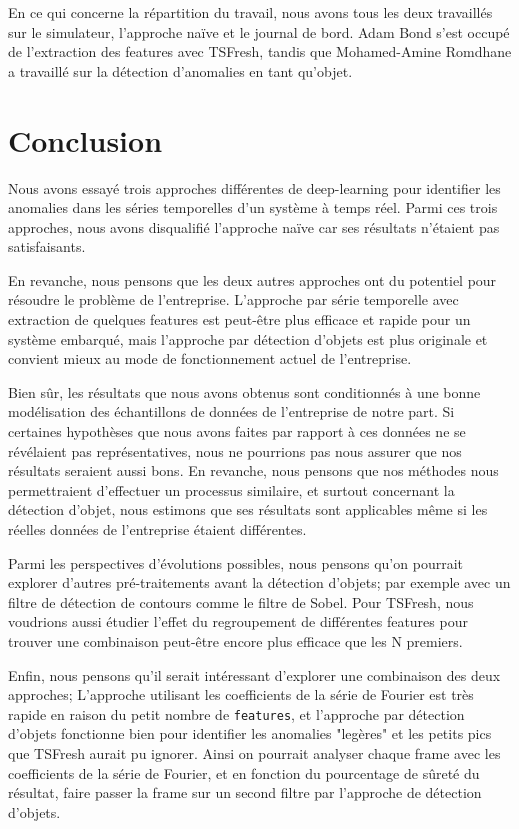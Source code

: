 \documentclass[french]{article}
\theoremstyle{mytheoremstyle}
\theoremstyle{mytheoremstyle}
\theoremstyle{myproblemstyle}
\begin{document}
    
    En ce qui concerne la répartition du travail, nous avons tous les deux travaillés sur le simulateur, l'approche naïve et le journal de bord. Adam Bond s'est occupé de l'extraction des features avec TSFresh, tandis que Mohamed-Amine Romdhane a travaillé sur la détection d'anomalies en tant qu'objet.
    
    
    
    
    \section{Conclusion}
    Nous avons essayé trois approches différentes de deep-learning pour identifier les anomalies dans les séries temporelles d'un système à temps réel. Parmi ces trois approches, nous avons disqualifié l'approche naïve car ses résultats n'étaient pas satisfaisants.
    
    
    En revanche, nous pensons que les deux autres approches ont du potentiel pour résoudre le problème de l'entreprise. L'approche par série temporelle avec extraction de quelques features est peut-être plus efficace et rapide pour un système embarqué, mais l'approche par détection d'objets est plus originale et convient mieux au mode de fonctionnement actuel de l'entreprise.
    
    
    Bien sûr, les résultats que nous avons obtenus sont conditionnés à une bonne modélisation des échantillons de données de l'entreprise de notre part. Si certaines hypothèses que nous avons faites par rapport à ces données ne se révélaient pas représentatives, nous ne pourrions pas nous assurer que nos résultats seraient aussi bons. En revanche, nous pensons que nos méthodes nous permettraient d'effectuer un processus similaire, et surtout concernant la détection d'objet, nous estimons que ses résultats sont applicables même si les réelles données de l'entreprise étaient différentes.
	    
	    
	    Parmi les perspectives d'évolutions possibles, nous pensons qu'on pourrait explorer d'autres pré-traitements avant la détection d'objets; par exemple avec un filtre de détection de contours comme le filtre de Sobel\cite{sobel}. Pour TSFresh, nous voudrions aussi étudier l'effet du regroupement de différentes features pour trouver une combinaison peut-être encore plus efficace que les N premiers.
	    
	    
	    Enfin, nous pensons qu'il serait intéressant d'explorer une combinaison des deux approches; L'approche utilisant les coefficients de la série de Fourier est très rapide en raison du petit nombre de \texttt{features}, et l'approche par détection d'objets fonctionne bien pour identifier les anomalies "legères" et les petits pics que TSFresh aurait pu ignorer. Ainsi on pourrait analyser chaque frame avec les coefficients de la série de Fourier, et en fonction du pourcentage de sûreté du résultat, faire passer la frame sur un second filtre par l'approche de détection d'objets.
\end{document}
